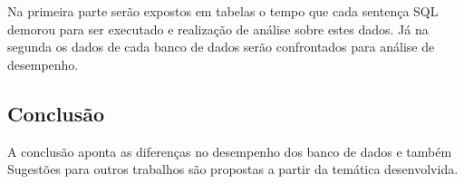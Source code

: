 Na primeira parte serão expostos em tabelas o tempo que cada sentença SQL demorou para ser executado e realização de análise sobre estes dados. Já na segunda os dados de cada banco de dados serão confrontados para análise de desempenho.

\subsection{Conclusão}
A conclusão aponta as diferenças no desempenho dos banco de dados e também  Sugestões  para  outros trabalhos são propostas a partir da temática desenvolvida. 












